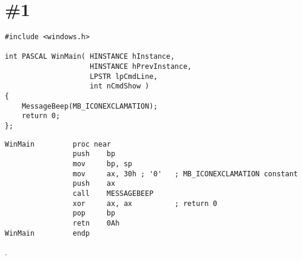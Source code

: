 \section{\Example \#1}
\begin{lstlisting}
#include <windows.h>

int PASCAL WinMain( HINSTANCE hInstance,
                    HINSTANCE hPrevInstance,
                    LPSTR lpCmdLine,
                    int nCmdShow )
{
	MessageBeep(MB_ICONEXCLAMATION);
	return 0;
};
\end{lstlisting}

\begin{lstlisting}
WinMain         proc near
                push    bp
                mov     bp, sp
                mov     ax, 30h ; '0'   ; MB_ICONEXCLAMATION constant
                push    ax
                call    MESSAGEBEEP
                xor     ax, ax          ; return 0
                pop     bp
                retn    0Ah
WinMain         endp
\end{lstlisting}

.

